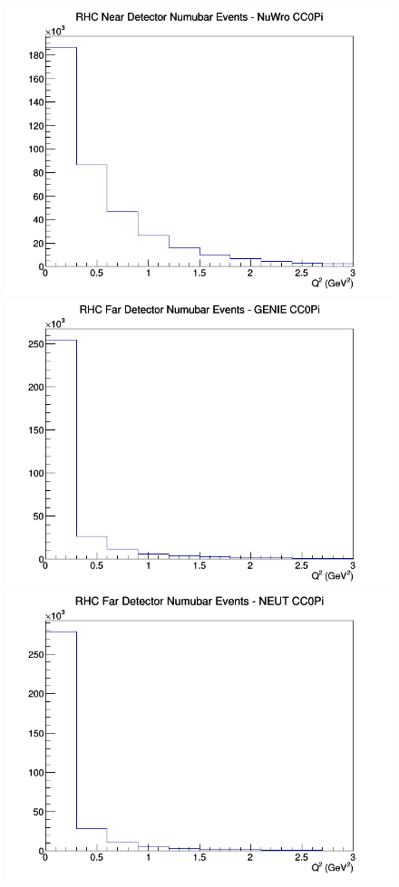 \begin{figure}[h]
\includegraphics[width=\linewidth]{eff_Q2/GAr/CC0Pi_RHC_ND_numubar_Q2_NuWro.png}
\endminipage
\newline
{}
\includegraphics[width=\linewidth]{eff_Q2/GAr/CC0Pi_RHC_FD_numubar_Q2_GENIE.png}
\endminipage
{}
\includegraphics[width=\linewidth]{eff_Q2/GAr/CC0Pi_RHC_FD_numubar_Q2_NEUT.png}

\end{figure}
